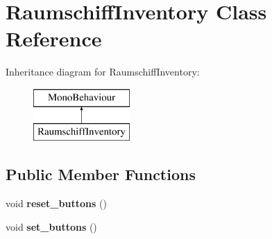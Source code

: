 \hypertarget{class_raumschiff_inventory}{}\section{Raumschiff\+Inventory Class Reference}
\label{class_raumschiff_inventory}
Inheritance diagram for Raumschiff\+Inventory\+:\begin{figure}[H]
\begin{center}
\leavevmode
\includegraphics[height=2.000000cm]{class_raumschiff_inventory}
\end{center}
\end{figure}
\subsection*{Public Member Functions}
\begin{DoxyCompactItemize}
\item 
\mbox{\label{class_raumschiff_inventory_afc5c732909d46de0120f565bfb46b3ee}} 
void {\bfseries reset\+\_\+buttons} ()
\item 
\mbox{\label{class_raumschiff_inventory_ad4afc170f452b87c3e458e698e01e78e}} 
void {\bfseries set\+\_\+buttons} ()
\end{DoxyCompactItemize}
